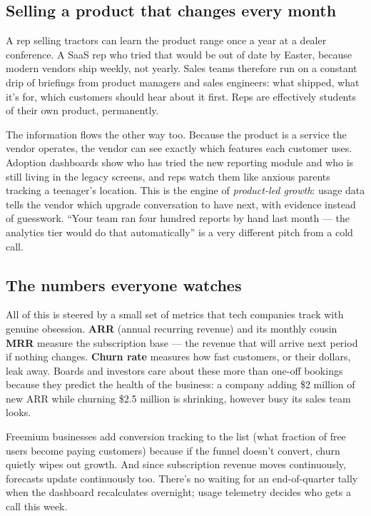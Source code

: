 \subsection{Selling a product that changes every month}


A rep selling tractors can learn the product range once a year at a dealer conference. A SaaS rep who tried that would be out of date by Easter, because modern vendors ship weekly, not yearly. Sales teams therefore run on a constant drip of briefings from product managers and sales engineers: what shipped, what it's for, which customers should hear about it first. Reps are effectively students of their own product, permanently.


The information flows the other way too. Because the product is a service the vendor operates, the vendor can see exactly which features each customer uses. Adoption dashboards show who has tried the new reporting module and who is still living in the legacy screens, and reps watch them like anxious parents tracking a teenager's location. This is the engine of \emph{product-led growth}: usage data tells the vendor which upgrade conversation to have next, with evidence instead of guesswork. ``Your team ran four hundred reports by hand last month — the analytics tier would do that automatically'' is a very different pitch from a cold call.



\subsection{The numbers everyone watches}


All of this is steered by a small set of metrics that tech companies track with genuine obsession. \textbf{ARR} (annual recurring revenue) and its monthly cousin \textbf{MRR} measure the subscription base — the revenue that will arrive next period if nothing changes. \textbf{Churn rate} measures how fast customers, or their dollars, leak away. Boards and investors care about these more than one-off bookings because they predict the health of the business: a company adding \$2 million of new ARR while churning \$2.5 million is shrinking, however busy its sales team looks.


Freemium businesses add conversion tracking to the list (what fraction of free users become paying customers) because if the funnel doesn't convert, churn quietly wipes out growth. And since subscription revenue moves continuously, forecasts update continuously too. There's no waiting for an end-of-quarter tally when the dashboard recalculates overnight; usage telemetry decides who gets a call this week.




